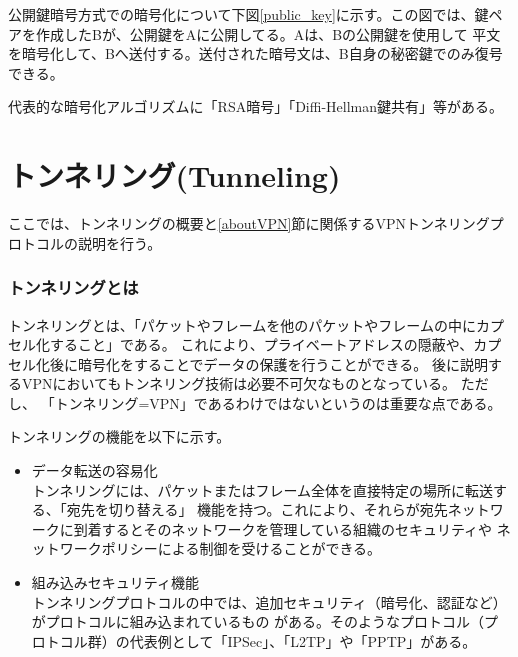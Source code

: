 \documentclass[11pt,a4j,titlepage]{jreport}
\begin{document}
公開鍵暗号方式での暗号化について下図\ref{public_key}に示す。この図では、鍵ペアを作成したBが、公開鍵をAに公開してる。Aは、Bの公開鍵を使用して
平文を暗号化して、Bへ送付する。送付された暗号文は、B自身の秘密鍵でのみ復号できる。


代表的な暗号化アルゴリズムに「RSA暗号」「Diffi-Hellman鍵共有」等がある。

\section{トンネリング(Tunneling)}\label{Tunnel}
ここでは、トンネリングの概要と\ref{aboutVPN}節に関係するVPNトンネリングプロトコルの説明を行う。

\subsubsection*{トンネリングとは}

トンネリングとは、「パケットやフレームを他のパケットやフレームの中にカプセル化すること」である。
これにより、プライベートアドレスの隠蔽や、カプセル化後に暗号化をすることでデータの保護を行うことができる。
後に説明するVPNにおいてもトンネリング技術は必要不可欠なものとなっている。
ただし、
「トンネリング=VPN」であるわけではないというのは重要な点である。

\par トンネリングの機能を以下に示す。
\begin{itemize}
    \item データ転送の容易化 \mbox{}\\
    トンネリングには、パケットまたはフレーム全体を直接特定の場所に転送する、「宛先を切り替える」
    機能を持つ。これにより、それらが宛先ネットワークに到着するとそのネットワークを管理している組織のセキュリティや
    ネットワークポリシーによる制御を受けることができる。
    \item 組み込みセキュリティ機能\mbox{}\\
    トンネリングプロトコルの中では、追加セキュリティ（暗号化、認証など）がプロトコルに組み込まれているもの
    がある。そのようなプロトコル（プロトコル群）の代表例として「IPSec」、「L2TP」や「PPTP」がある。
\end{itemize}
\end{document}
